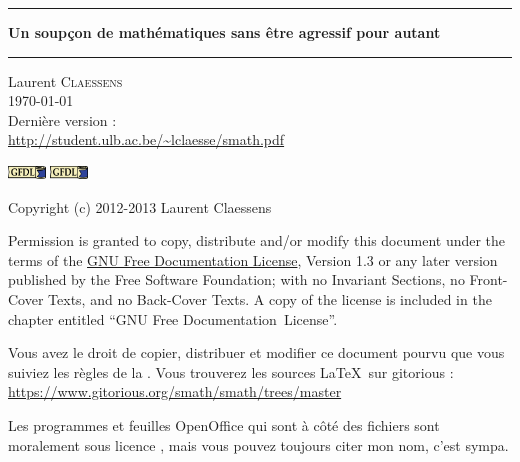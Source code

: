 
\thispagestyle{empty}
\begin{center}
  \begin{minipage}{15cm}
    \hrule\par
    \vspace{2mm}
    \begin{center}
    \Huge \bfseries Un soupçon de mathématiques sans être agressif pour autant \par
    \end{center}
    \hrule\par
  \end{minipage}
\end{center}

\vspace{2cm}

\begin{center}
    Laurent \textsc{Claessens}\\
    \today\\
    Dernière version :\\
    \url{http://student.ulb.ac.be/~lclaesse/smath.pdf}
\end{center}

\vfill

\begin{center}

           \ifpdf
            \includegraphics[width=1cm]{gfdl-logo-small.png}
        \else
            \includegraphics[width=1cm]{gfdl-logo-small.eps}
        \fi

Copyright (c) 2012-2013  Laurent Claessens

Permission is granted to copy, distribute and/or modify this document under the terms of the \href{http://www.gnu.org/licenses/fdl-1.3.html}{GNU Free Documentation License}, Version 1.3 or any later version published by the Free Software Foundation; with no Invariant Sections, no Front-Cover Texts, and no Back-Cover Texts. A copy of the license is included in the chapter entitled ``GNU Free Documentation~License''.

\vspace{0.5cm}

Vous avez le droit de copier, distribuer et modifier ce document pourvu que vous suiviez les règles de la . Vous trouverez les sources \LaTeX\ sur gitorious :\\
    \url{https://www.gitorious.org/smath/smath/trees/master}

    Les programmes et feuilles OpenOffice qui sont à côté des fichiers  sont moralement sous licence , mais vous pouvez toujours citer mon nom, c'est sympa.

\end{center}
